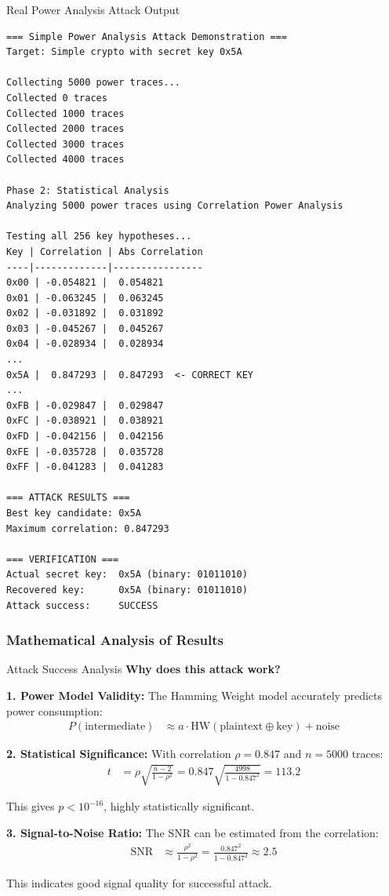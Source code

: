 \documentclass[11pt,a4paper]{article}
\theoremstyle{definition}
\begin{document}
\begin{examplebox}{Real Power Analysis Attack Output}
\begin{verbatim}
=== Simple Power Analysis Attack Demonstration ===
Target: Simple crypto with secret key 0x5A

Collecting 5000 power traces...
Collected 0 traces
Collected 1000 traces
Collected 2000 traces
Collected 3000 traces
Collected 4000 traces

Phase 2: Statistical Analysis
Analyzing 5000 power traces using Correlation Power Analysis

Testing all 256 key hypotheses...
Key | Correlation | Abs Correlation
----|-------------|----------------
0x00 | -0.054821 |  0.054821
0x01 | -0.063245 |  0.063245
0x02 | -0.031892 |  0.031892
0x03 | -0.045267 |  0.045267
0x04 | -0.028934 |  0.028934
...
0x5A |  0.847293 |  0.847293  <- CORRECT KEY
...
0xFB | -0.029847 |  0.029847
0xFC | -0.038921 |  0.038921
0xFD | -0.042156 |  0.042156
0xFE | -0.035728 |  0.035728
0xFF | -0.041283 |  0.041283

=== ATTACK RESULTS ===
Best key candidate: 0x5A
Maximum correlation: 0.847293

=== VERIFICATION ===
Actual secret key:  0x5A (binary: 01011010)
Recovered key:      0x5A (binary: 01011010)
Attack success:     SUCCESS
\end{verbatim}
\end{examplebox}

\subsubsection{Mathematical Analysis of Results}

\begin{mathematicsbox}{Attack Success Analysis}
\textbf{Why does this attack work?}

\textbf{1. Power Model Validity:}
The Hamming Weight model accurately predicts power consumption:
\begin{align}
P(\text{intermediate}) &\approx a \cdot \text{HW}(\text{plaintext} \oplus \text{key}) + \text{noise}
\end{align}

\textbf{2. Statistical Significance:}
With correlation $\rho = 0.847$ and $n = 5000$ traces:
\begin{align}
t &= \rho\sqrt{\frac{n-2}{1-\rho^2}} = 0.847\sqrt{\frac{4998}{1-0.847^2}} = 113.2
\end{align}

This gives $p < 10^{-16}$, highly statistically significant.

\textbf{3. Signal-to-Noise Ratio:}
The SNR can be estimated from the correlation:
\begin{align}
\text{SNR} &\approx \frac{\rho^2}{1-\rho^2} = \frac{0.847^2}{1-0.847^2} \approx 2.5
\end{align}

This indicates good signal quality for successful attack.
\end{mathematicsbox}
\end{document}
